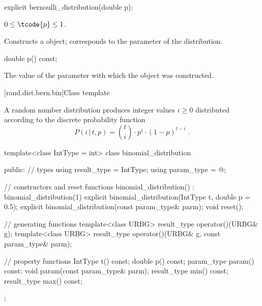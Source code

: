%
\begin{itemdecl}
explicit bernoulli_distribution(double p);
\end{itemdecl}

\begin{itemdescr}
\pnum\requires
 $0 \leq \tcode{p} \leq 1$.

\pnum\effects Constructs a  object;
 corresponds to the parameter of the distribution.
\end{itemdescr}

%
\begin{itemdecl}
double p() const;
\end{itemdecl}

\begin{itemdescr}
\pnum\returns The value of the  parameter
 with which the object was constructed.
\end{itemdescr}


[rand.dist.bern.bin]{Class template }%
%
%

\pnum
A  random number distribution
produces integer values $i \geq 0$
distributed according to
the discrete probability function%
%
%
\[ P(i\,|\,t,p) = \binom{t}{i} \cdot p^i \cdot (1-p)^{t-i} \text{ .} \]

%
\begin{codeblock}
template<class IntType = int>
  class binomial_distribution {
  public:
    // types
    using result_type = IntType;
    using param_type  = @\unspec@;

    // constructors and reset functions
    binomial_distribution() : binomial_distribution(1) {}
    explicit binomial_distribution(IntType t, double p = 0.5);
    explicit binomial_distribution(const param_type& parm);
    void reset();

    // generating functions
    template<class URBG>
      result_type operator()(URBG& g);
    template<class URBG>
      result_type operator()(URBG& g, const param_type& parm);

    // property functions
    IntType t() const;
    double p() const;
    param_type param() const;
    void param(const param_type& parm);
    result_type min() const;
    result_type max() const;
  };
\end{codeblock}


